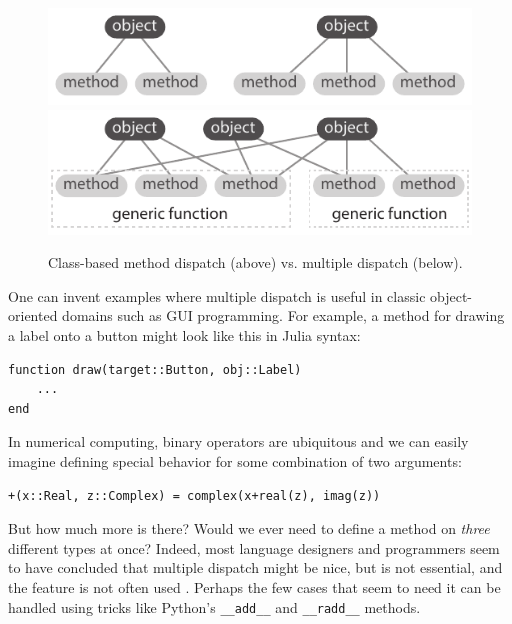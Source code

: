 \documentclass{sigplanconf}
\newcommand{\code}[1]{\texttt{#1}}
\begin{document}
\begin{figure}
  \centering
  \includegraphics[width=\columnwidth]{fig-dispatch-class}
  \includegraphics[width=\columnwidth]{fig-dispatch-multiple}
  \caption{\label{fig:dispatch}Class-based method dispatch (above) vs. multiple dispatch (below).}
\end{figure}

One can invent examples where multiple dispatch is useful in classic
object-oriented domains such as GUI programming.
For example, a method for drawing a label onto a button might
look like this in Julia syntax:

\begin{minipage}{\linewidth}
\begin{verbatim}
function draw(target::Button, obj::Label)
    ...
end

\end{verbatim}
\end{minipage}

In numerical computing, binary operators are ubiquitous and we can easily imagine
defining special behavior for some combination of two arguments:

\begin{verbatim}
+(x::Real, z::Complex) = complex(x+real(z), imag(z))
\end{verbatim}

But how much more is there? Would we ever need to define a method on
\emph{three} different types at once? Indeed, most language designers and
programmers seem to have concluded that multiple dispatch might be nice, but is
not essential, and the feature is not often used \cite{Muschevici:2008}.
Perhaps the few cases that seem to need it can be handled using tricks like
Python's \code{\_\_add\_\_} and \code{\_\_radd\_\_} methods.
\end{document}
